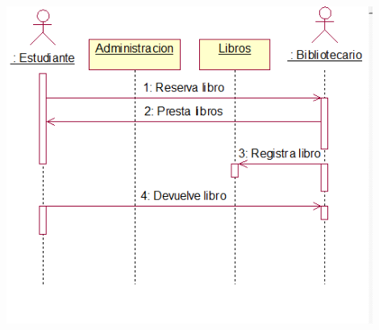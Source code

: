 \begin{enumerate}[1.]
\begin{center}
	\includegraphics[width=12cm]{./Imagenes/img3} 
	\end{center}
\end{enumerate} 
